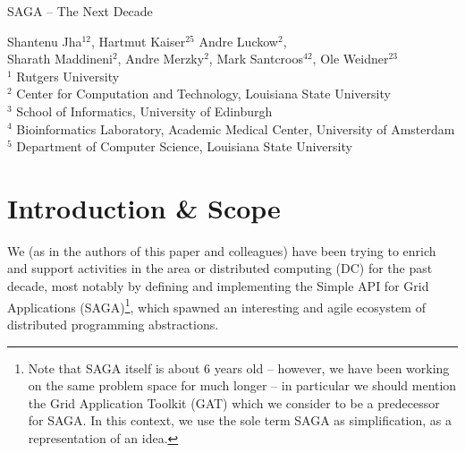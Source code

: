 \documentclass{article}
\newcommand{\I}[1]{\textit{#1}}
\begin{document}
\begin{center}
 {\Large SAGA -- The Next Decade}
\end{center}

{
 {
  \centering
  Shantenu Jha$^{12}$,
  Hartmut Kaiser$^{25}$
  Andre Luckow$^{2}$,\\
  Sharath Maddineni$^{2}$,
  Andre Merzky$^{2}$,
  Mark Santcroos$^{42}$,
  Ole Weidner$^{23}$
  \\[0.4em]
  }
 \noindent
 \tiny
 $^1$ Rutgers University\\[-1.0em]
 $^2$ Center for Computation and Technology, Louisiana State University\\[-1.0em]
 $^3$ School of Informatics, University of Edinburgh \\[-1.0em]
 $^4$ Bioinformatics Laboratory, Academic Medical Center, University of Amsterdam\\[-1.0em]
 $^5$ Department of Computer Science, Louisiana State University\\[-1.0em]
}

\begin{abstract}

  
  The SAGA Project (as described below) has grown over time and
  evolved with \I{`the infrastructure'}. In this paper, we provide
  a retrospective (an analysis of where we are, and why), as well as
  a forward looking evolution and growth trajectory for our project.
  The purpose of this paper is to place SAGA in the past and future
  evolution of computing infrastructures, but also, to help us to
  consolidate the SAGA Project.

\end{abstract}


\section{Introduction \& Scope }
\label{sec:intro}

We (as in the authors of this paper and colleagues) have been trying
to enrich and support activities in the area or distributed computing
(DC) for the past decade, most notably by defining and implementing
the Simple API for Grid Applications (SAGA)\footnote{Note that SAGA
itself is about 6 years old -- however, we have been working on the
same problem space for much longer -- in particular we should mention
the Grid Application Toolkit (GAT) which we consider to be
a predecessor for SAGA.  In this context, we use the sole term SAGA as
simplification, as a representation of an idea.}, which spawned an
interesting and agile ecosystem of distributed programming
abstractions.
 
\end{document}
